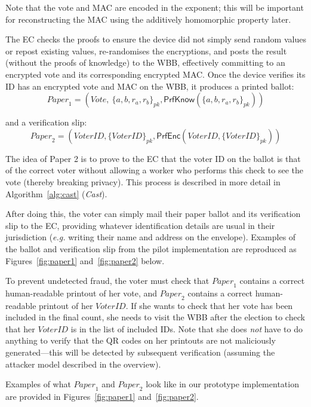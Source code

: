 \documentclass[12pt,a4paper]{article}
\newcommand{\PrfEnc}{\mathsf{PrfEnc}}
\newcommand{\PrfKnow}{\mathsf{PrfKnow}}
\theoremstyle{definition}
\newcommand{\Vote}{\mathit{Vote}}
\newcommand{\VoterID}{\mathit{VoterID}}
\newcommand{\Paper}{\mathit{Paper}}
\newcommand{\eg}{\textit{e.g. }}
\begin{document}
Note that the vote and MAC are encoded in the exponent; this will be important for reconstructing the MAC using the additively homomorphic property later.

The EC checks the proofs to ensure the device did not simply send random values or repost existing values, re-randomises the encryptions, and posts the result (without the proofs of knowledge) to the WBB, effectively committing to an encrypted vote and its corresponding encrypted MAC. Once the device verifies its ID has an encrypted vote and MAC on the WBB, it produces a printed ballot:
$$\Paper_1 = \left(\Vote,\ \{a,b,r_a,r_b\}_{pk}, \PrfKnow(\{a,b,r_a,r_b\}_{pk})\right)$$

and a verification slip:
$$\Paper_2 = \left(\VoterID, \{\VoterID\}_{pk}, \PrfEnc(\VoterID, \{\VoterID\}_{pk})\right)$$

The idea of Paper 2 is to prove to the EC that the voter ID on the ballot is that of the correct voter without allowing a worker who performs this check to see the vote (thereby breaking privacy). This process is described in more detail in Algorithm~\ref{alg:cast} (\textit{Cast}).

After doing this, the voter can simply mail their paper ballot and its verification slip to the EC, providing whatever identification details are usual in their jurisdiction (\eg writing their name and address on the envelope). Examples of the ballot and verification slip from the pilot implementation are reproduced as Figures~\ref{fig:paper1} and~\ref{fig:paper2} below.

To prevent undetected fraud, the voter must check that $\Paper_1$ contains a correct human-readable printout of her vote, and $\Paper_2$ contains a correct human-readable printout of her $\VoterID$. If she wants to check that her vote has been included in the final count, she needs to visit the WBB after the election to check that her $\VoterID$ is in the list of included IDs.  Note that she does \emph{not} have to do anything to verify that the QR codes on her printouts are not maliciously generated---this will be detected by subsequent verification (assuming the attacker model described in the overview).

Examples of what $\Paper_1$ and $\Paper_2$ look like in our prototype implementation are provided in Figures~\ref{fig:paper1} and~\ref{fig:paper2}.
\end{document}
